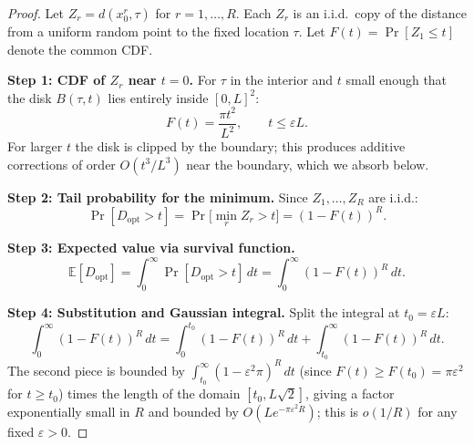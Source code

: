 \begin{proof}
Let $Z_r = d(x_0^r, \tau)$ for $r = 1,\ldots,R$.
Each $Z_r$ is an i.i.d.\ copy of the distance from a uniform random point
to the fixed location $\tau$.
Let $F(t) = \Pr[Z_1 \leq t]$ denote the common CDF.

\textbf{Step 1: CDF of $Z_r$ near $t=0$.}
For $\tau$ in the interior and $t$ small enough that the disk $B(\tau,t)$
lies entirely inside $[0,L]^2$:
\begin{equation}\label{eq:cdf-disk}
  F(t) = \frac{\pi t^2}{L^2}, \qquad t \leq \varepsilon L.
\end{equation}
For larger $t$ the disk is clipped by the boundary; this produces additive
corrections of order $O(t^3/L^3)$ near the boundary, which we absorb below.

\textbf{Step 2: Tail probability for the minimum.}
Since $Z_1,\ldots,Z_R$ are i.i.d.:
\begin{equation}\label{eq:tail-min}
  \Pr[D_{\mathrm{opt}} > t]
  = \Pr\!\bigl[\min_r Z_r > t\bigr]
  = (1-F(t))^R.
\end{equation}

\textbf{Step 3: Expected value via survival function.}
\begin{equation}\label{eq:survival}
  \mathbb{E}[D_{\mathrm{opt}}]
  = \int_0^\infty \Pr[D_{\mathrm{opt}} > t]\,dt
  = \int_0^\infty (1-F(t))^R\,dt.
\end{equation}

\textbf{Step 4: Substitution and Gaussian integral.}
Split the integral at $t_0 = \varepsilon L$:
\[
  \int_0^\infty (1-F(t))^R\,dt
  = \int_0^{t_0}(1-F(t))^R\,dt
  + \int_{t_0}^\infty (1-F(t))^R\,dt.
\]
The second piece is bounded by $\int_{t_0}^\infty (1-\varepsilon^2\pi)^R\,dt$
(since $F(t) \geq F(t_0) = \pi\varepsilon^2$ for $t \geq t_0$) times the
length of the domain $[t_0, L\sqrt{2}]$, giving a factor exponentially
small in $R$ and bounded by $O(L e^{-\pi\varepsilon^2 R})$; this is $o(1/R)$
for any fixed $\varepsilon > 0$.


\end{proof}
